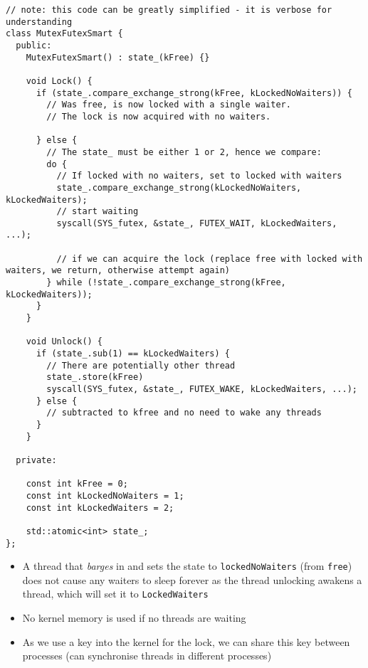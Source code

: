 \begin{verbatim}
// note: this code can be greatly simplified - it is verbose for understanding
class MutexFutexSmart {
  public:
    MutexFutexSmart() : state_(kFree) {}

    void Lock() {
      if (state_.compare_exchange_strong(kFree, kLockedNoWaiters)) {
        // Was free, is now locked with a single waiter.
        // The lock is now acquired with no waiters.

      } else {
        // The state_ must be either 1 or 2, hence we compare:
        do {
          // If locked with no waiters, set to locked with waiters
          state_.compare_exchange_strong(kLockedNoWaiters, kLockedWaiters);
          // start waiting
          syscall(SYS_futex, &state_, FUTEX_WAIT, kLockedWaiters, ...);

          // if we can acquire the lock (replace free with locked with waiters, we return, otherwise attempt again)
        } while (!state_.compare_exchange_strong(kFree, kLockedWaiters));
      }
    }

    void Unlock() {
      if (state_.sub(1) == kLockedWaiters) {
        // There are potentially other thread
        state_.store(kFree)
        syscall(SYS_futex, &state_, FUTEX_WAKE, kLockedWaiters, ...);
      } else {
        // subtracted to kfree and no need to wake any threads
      }
    }

  private:

    const int kFree = 0;
    const int kLockedNoWaiters = 1;
    const int kLockedWaiters = 2;

    std::atomic<int> state_;
};
\end{verbatim}
\begin{itemize}
	\item A thread that \textit{barges} in and sets the state to \texttt{lockedNoWaiters} (from \texttt{free}) does not cause any waiters to sleep forever as the thread unlocking awakens a thread, which will set it to \texttt{LockedWaiters}
	\item No kernel memory is used if no threads are waiting
	\item As we use a key into the kernel for the lock, we can share this key between processes (can synchronise threads in different processes)
\end{itemize}


